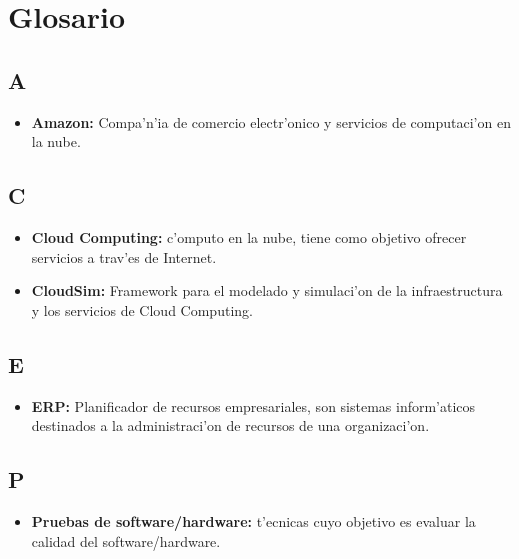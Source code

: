 \chapter*{Glosario}
\section*{A}
\begin{itemize}
	\item \textbf{Amazon:} Compa'n'ia de comercio electr'onico y servicios de computaci'on en la nube.
\end{itemize}

\section*{C}

\begin{itemize}
	\item \textbf{Cloud Computing:} c'omputo en la nube, tiene como objetivo ofrecer servicios a trav'es de Internet.
	\item \textbf{CloudSim:} Framework para el modelado y simulaci'on de la infraestructura y los servicios de Cloud Computing.
		
	
\end{itemize}
\section*{E}
\begin{itemize}
	\item \textbf{ERP:} Planificador de recursos empresariales, son sistemas inform'aticos destinados a la administraci'on de recursos de una organizaci'on.
	
	
\end{itemize}
\section*{P}
\begin{itemize}
	\item \textbf{Pruebas de software/hardware:} t'ecnicas cuyo objetivo es evaluar la calidad del software/hardware.

\end{itemize}




